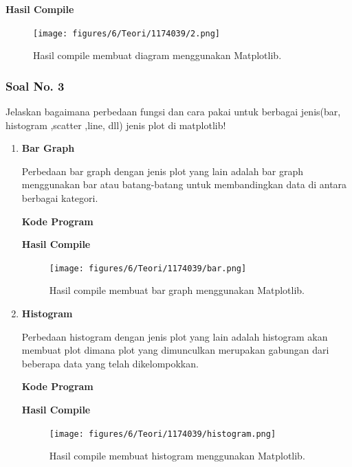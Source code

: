 \hfill \break
\textbf{Hasil Compile}

\begin{figure}[H]
	\texttt{[image: figures/6/Teori/1174039/2.png]}
	\centering
	\caption{Hasil compile membuat diagram menggunakan Matplotlib.}
\end{figure}
 
\subsubsection{Soal No. 3}
\hfill \break
Jelaskan bagaimana perbedaan fungsi dan cara pakai untuk berbagai jenis(bar, histogram ,scatter ,line, dll) jenis plot di matplotlib!

\begin{enumerate}
	\item \textbf{Bar Graph}
	
	Perbedaan bar graph dengan jenis plot yang lain adalah bar graph menggunakan bar atau batang-batang untuk membandingkan data di antara berbagai kategori.
	
	\textbf{Kode Program}
	
	
	
	\textbf{Hasil Compile}
	
	\begin{figure}[H]
		\texttt{[image: figures/6/Teori/1174039/bar.png]}
		\centering
		\caption{Hasil compile membuat bar graph menggunakan Matplotlib.}
	\end{figure}
	
	\item \textbf{Histogram}
	
	Perbedaan histogram dengan jenis plot yang lain adalah histogram akan membuat plot dimana plot yang dimunculkan merupakan gabungan dari beberapa data yang telah dikelompokkan.
	
	\textbf{Kode Program}
	
	
	
	\textbf{Hasil Compile}
	
	\begin{figure}[H]
		\texttt{[image: figures/6/Teori/1174039/histogram.png]}
		\centering
		\caption{Hasil compile membuat histogram menggunakan Matplotlib.}
	\end{figure}
	

\end{enumerate}
